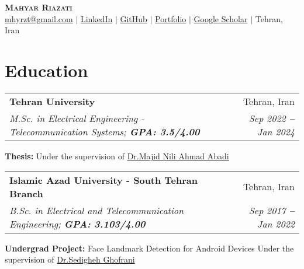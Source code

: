 \documentclass[letterpaper,11pt]{article}
\makeatletter
\newcommand{\resumeEducationHeading}[6]{
  \vspace{-2pt}\item
    \begin{tabular*}{0.97\textwidth}[t]{l@{\extracolsep{\fill}}r}
      \textbf{#1} & #2 \\
      \textit{\small#3} & \textit{\small #4} \\

    \end{tabular*}\vspace{-5pt}
}
\newcommand{\resumeSubHeadingListStart}{\begin{itemize}[leftmargin=0.15in, label={}]}
\newcommand{\resumeSubHeadingListEnd}{\end{itemize}}
\makeatother
\begin{document}
\begin{center}
	\textbf{\Huge \scshape Mahyar Riazati} \\ \vspace{8pt}
	\small
	\faEnvelope \hspace{.5pt} \href{mailto:mhyrzt@gmail.com}{mhyrzt@gmail.com}
	$|$
	\faLinkedinSquare \hspace{.5pt} \href{https://www.linkedin.com/in/mhyrzt}{LinkedIn}
	$|$
	\faGithub \hspace{.5pt} \href{https://github.com/mhyrzt}{GitHub}
	$|$
	\faGlobe \hspace{.5pt} \href{https://mhyrzt.me}{Portfolio}
	$|$
	\faGraduationCap \hspace{.5pt} \href{https://scholar.google.com/citations?user=k-nwlcYAAAAJ&hl=en}{Google Scholar}
	$|$
	\faMapMarker \hspace{.5pt} Tehran, Iran
\end{center}




\section{Education}
\vspace{3pt}
\resumeSubHeadingListStart

\resumeEducationHeading
{Tehran University}{Tehran, Iran}
{M.Sc. in Electrical Engineering - Telecommunication Systems; \textbf{GPA: 3.5/4.00}}{Sep 2022 \textbf{--} Jan 2024}
{} {}
\resumeSubHeadingListStart
\small{\item{\textbf{Thesis:} Under the supervision of \href{https://ece.ut.ac.ir/en/~mnili}{\color{blue}Dr.Majid Nili Ahmad Abadi}}}
\resumeSubHeadingListEnd

\resumeEducationHeading
{Islamic Azad University - South Tehran Branch}{Tehran, Iran}
{B.Sc. in Electrical and Telecommunication Engineering; \textbf{GPA: 3.103/4.00}}{Sep 2017 \textbf{--} Jan 2022}
{} {}
\resumeSubHeadingListStart
\small{\item{\textbf{Undergrad Project:} Face Landmark Detection for Android Devices Under the supervision of  \href{https://www.linkedin.com/in/sedigheh-ghofrani-b6495b63/}{\color{blue}Dr.Sedigheh Ghofrani}}}
\resumeSubHeadingListEnd

\resumeSubHeadingListEnd



\end{document}
